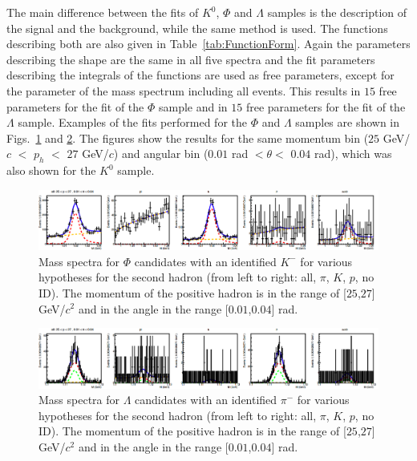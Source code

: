 The main difference between the fits of $K^0$, $\Phi$ and $\Lambda$ samples is the description of the signal and the background, while the same method is used. The functions describing both are also given in Table~\ref{tab:FunctionForm}. Again the parameters describing the shape are the same in all five spectra and the fit parameters  describing the integrals of the functions are used as free parameters, except for the parameter of the mass spectrum including all events. This results in $15$ free parameters for the fit of the $\Phi$ sample and in $15$ free parameters for the fit of the $\Lambda$ sample. Examples of the fits performed for the $\Phi$ and $\Lambda$ samples are shown in Figs.~\ref{pic:PhiMassSpectra} and \ref{pic:LambdaMassSpectra}. The figures show the results for the same momentum bin ($25$ GeV/$c$ $<$ $p_h$ $<$ $27$ GeV/$c$) and angular bin ($0.01$ rad $< \theta <$ $0.04$ rad), which was also shown for the $K^0$ sample.

\begin{figure}[!h]
  \centering
	\includegraphics[scale=0.3]{./gfx/PhiMassSpectra.png}
	\caption{Mass spectra for $\Phi$ candidates with an identified $K^-$ for various hypotheses for the second hadron (from left to right: all, $\pi$, $K$, $p$, no ID). The momentum of the positive hadron is in the range of [$25$,$27$] GeV/$c^2$ and in the angle in the range [$0.01$,$0.04$] rad.}
	\label{pic:PhiMassSpectra}
\end{figure}

\begin{figure}[!h]
  \centering
	\includegraphics[scale=0.3]{./gfx/LambdaMassSpectra.png}
	\caption{Mass spectra for $\Lambda$ candidates with an identified $\pi^-$ for various hypotheses for the second hadron (from left to right: all, $\pi$, $K$, $p$, no ID). The momentum of the positive hadron is in the range of [$25$,$27$] GeV/$c^2$ and in the angle in the range [$0.01$,$0.04$] rad.}
	\label{pic:LambdaMassSpectra}
\end{figure}

